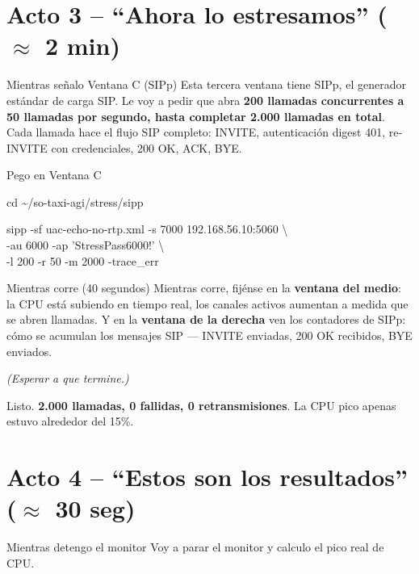 \documentclass[11pt,letterpaper]{article}
\begin{document}
\section*{Acto 3 -- ``Ahora lo estresamos'' ($\approx$ 2 min)}

\begin{habla}{Mientras se\~nalo Ventana C (SIPp)}
Esta tercera ventana tiene SIPp, el generador est\'andar de carga SIP. Le voy a pedir que abra \textbf{200 llamadas concurrentes a 50 llamadas por segundo, hasta completar 2.000 llamadas en total}. Cada llamada hace el flujo SIP completo: INVITE, autenticaci\'on digest 401, re-INVITE con credenciales, 200 OK, ACK, BYE.
\end{habla}

\begin{accion}{Pego en Ventana C}
\begin{comando}
cd \textasciitilde/so-taxi-agi/stress/sipp

sipp -sf uac-echo-no-rtp.xml -s 7000 192.168.56.10:5060 \textbackslash\\
\hspace*{1em}-au 6000 -ap 'StressPass6000!' \textbackslash\\
\hspace*{1em}-l 200 -r 50 -m 2000 -trace\_err
\end{comando}
\end{accion}

\begin{habla}{Mientras corre (40 segundos)}
Mientras corre, fij\'ense en la \textbf{ventana del medio}: la CPU est\'a subiendo en tiempo real, los canales activos aumentan a medida que se abren llamadas. Y en la \textbf{ventana de la derecha} ven los contadores de SIPp: c\'omo se acumulan los mensajes SIP --- INVITE enviadas, 200 OK recibidos, BYE enviados.

\textit{(Esperar a que termine.)}

Listo. \textbf{2.000 llamadas, 0 fallidas, 0 retransmisiones}. La CPU pico apenas estuvo alrededor del 15\%.
\end{habla}

\section*{Acto 4 -- ``Estos son los resultados'' ($\approx$ 30 seg)}

\begin{habla}{Mientras detengo el monitor}
Voy a parar el monitor y calculo el pico real de CPU.
\end{habla}
\end{document}
